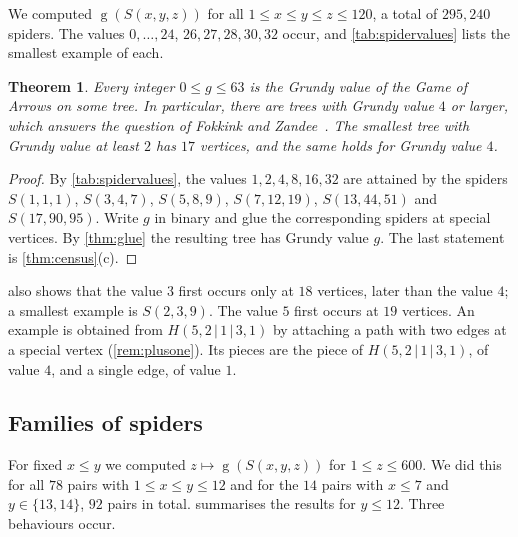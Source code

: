 \documentclass[11pt]{amsart}
\newtheorem{theorem}{Theorem}[section]
\theoremstyle{definition}
\theoremstyle{remark}
\newcommand{\gv}{\operatorname{g}}           %
\newcommand{\Sp}{S}
\begin{document}
We computed $\gv(\Sp(x,y,z))$ for all $1\le x\le y\le z\le 120$, a total of $295{,}240$ spiders. The values $0,\dots,24$, $26,27,28,30,32$ occur, and \cref{tab:spidervalues} lists the smallest example of each.

\begin{theorem}\label{thm:allvalues}
Every integer $0\le g\le 63$ is the Grundy value of the Game of Arrows on some tree. In particular, there are trees with Grundy value $4$ or larger, which answers the question of Fokkink and Zandee~\cite{Fokkink2024}. The smallest tree with Grundy value at least $2$ has $17$ vertices, and the same holds for Grundy value $4$.
\end{theorem}

\begin{proof}
By \cref{tab:spidervalues}, the values $1,2,4,8,16,32$ are attained by the spiders $\Sp(1,1,1)$, $\Sp(3,4,7)$, $\Sp(5,8,9)$, $\Sp(7,12,19)$, $\Sp(13,44,51)$ and $\Sp(17,90,95)$. Write $g$ in binary and glue the corresponding spiders at special vertices. By \cref{thm:glue} the resulting tree has Grundy value $g$. The last statement is \cref{thm:census}(c).
\end{proof}

 also shows that the value $3$ first occurs only at $18$ vertices, later than the value $4$; a smallest example is $\Sp(2,3,9)$. The value $5$ first occurs at $19$ vertices. An example is obtained from $H(5,2\,|\,1\,|\,3,1)$ by attaching a path with two edges at a special vertex (\cref{rem:plusone}). Its pieces are the piece of $H(5,2\,|\,1\,|\,3,1)$, of value $4$, and a single edge, of value $1$.

\subsection{Families of spiders}\label{sec:families}
For fixed $x\le y$ we computed $z\mapsto\gv(\Sp(x,y,z))$ for $1\le z\le 600$. We did this for all $78$ pairs with $1\le x\le y\le 12$ and for the $14$ pairs with $x\le 7$ and $y\in\{13,14\}$, $92$ pairs in total.  summarises the results for $y\le 12$. Three behaviours occur.
\end{document}
